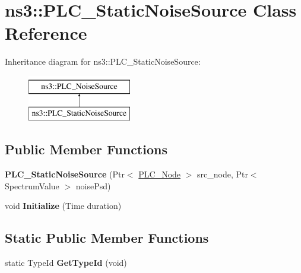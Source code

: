 \hypertarget{classns3_1_1PLC__StaticNoiseSource}{\section{ns3\-:\-:\-P\-L\-C\-\_\-\-Static\-Noise\-Source \-Class \-Reference}
\label{classns3_1_1PLC__StaticNoiseSource}
}
\-Inheritance diagram for ns3\-:\-:\-P\-L\-C\-\_\-\-Static\-Noise\-Source\-:\begin{figure}[H]
\begin{center}
\leavevmode
\includegraphics[height=2.000000cm]{classns3_1_1PLC__StaticNoiseSource}
\end{center}
\end{figure}
\subsection*{\-Public \-Member \-Functions}
\begin{DoxyCompactItemize}
\item 
\hypertarget{classns3_1_1PLC__StaticNoiseSource_a6ff8b14ea53478865d3718011960c8a4}{{\bfseries \-P\-L\-C\-\_\-\-Static\-Noise\-Source} (\-Ptr$<$ \hyperlink{classns3_1_1PLC__Node}{\-P\-L\-C\-\_\-\-Node} $>$ src\-\_\-node, \-Ptr$<$ \-Spectrum\-Value $>$ noise\-Psd)}\label{classns3_1_1PLC__StaticNoiseSource_a6ff8b14ea53478865d3718011960c8a4}

\item 
\hypertarget{classns3_1_1PLC__StaticNoiseSource_a2cdc9f92c961795126a7db193e929e6b}{void {\bfseries \-Initialize} (\-Time duration)}\label{classns3_1_1PLC__StaticNoiseSource_a2cdc9f92c961795126a7db193e929e6b}

\end{DoxyCompactItemize}
\subsection*{\-Static \-Public \-Member \-Functions}
\begin{DoxyCompactItemize}
\item 
\hypertarget{classns3_1_1PLC__StaticNoiseSource_a268a19f26e7f6c5d25782ffb2f7341a5}{static \-Type\-Id {\bfseries \-Get\-Type\-Id} (void)}\label{classns3_1_1PLC__StaticNoiseSource_a268a19f26e7f6c5d25782ffb2f7341a5}

\end{DoxyCompactItemize}
